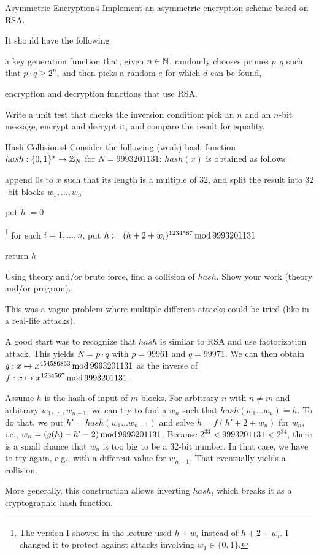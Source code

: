 \documentclass[a4paper]{article}
\begin{document}
\header

\begin{problem}{Asymmetric Encryption}{4}
Implement an asymmetric encryption scheme based on RSA.

It should have the following
\begin{compactitem}
 \item a key generation function that, given $n\in \mathbb{N}$, randomly chooses primes $p,q$ such that $p\cdot q\geq 2^n$, and then picks a random $e$ for which $d$ can be found,
 \item encryption and decryption functions that use RSA.
\end{compactitem}

Write a unit test that checks the inversion condition: pick an $n$ and an $n$-bit message, encrypt and decrypt it, and compare the result for equality.
\end{problem}

\begin{problem}{Hash Collisions}{4}
Consider the following (weak) hash function $hash:\{0,1\}^*\to \mathbb{Z}_N$ for $N=9993201131$: $hash(x)$ is obtained as follows
\begin{compactenum}
 \item append $0$s to $x$ such that its length is a multiple of $32$, and split the result into $32$-bit blocks $w_1,\ldots, w_n$
 \item put $h:=0$
 \item\footnote{The version I showed in the lecture used $h+w_i$ instead of $h+2+w_i$. I changed it to protect against attacks involving $w_1\in\{0,1\}$.}
  for each $i=1,\ldots,n$, put $h:=(h+2+w_i)^{1234567}\mathop{\mathrm{mod}} 9993201131$
 \item return $h$
\end{compactenum}

Using theory and/or brute force, find a collision of $hash$.
Show your work (theory and/or program).

\begin{solution}
This was a vague problem where multiple different attacks could be tried (like in a real-life attacks).

A good start was to recognize that $hash$ is similar to RSA and use factorization attack.
This yields $N=p\cdot q$ with $p=99961$ and $q=99971$.
We can then obtain $g:x\mapsto x^{454586863}\mathop{\mathrm{mod}} 9993201131$ as the inverse of $f:x\mapsto x^{1234567}\mathop{\mathrm{mod}} 9993201131$.

Assume $h$ is the hash of input of $m$ blocks.
For arbitrary $n$ with $n\neq m$ and arbitrary $w_1,\ldots,w_{n-1}$, we can try to find a $w_n$ such that $hash(w_1\ldots w_n)=h$.
To do that, we put $h'=hash(w_1\ldots w_{n-1})$ and solve $h=f(h'+2+w_n)$ for $w_n$, i.e., $w_n=(g(h)-h'-2)\mathop{\mathrm{mod}} 9993201131$.
Because $2^{33}<9993201131<2^{34}$, there is a small chance that $w_n$ is too big to be a $32$-bit number.
In that case, we have to try again, e.g., with a different value for $w_{n-1}$.
That eventually yields a collision.

More generally, this construction allows inverting $hash$, which breaks it as a cryptographic hash function.
\end{solution}
\end{problem}
\end{document}
